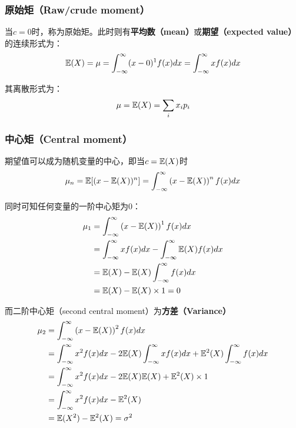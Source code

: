 \documentclass[11pt]{article}
\begin{document}
\subsubsection*{原始矩（Raw/crude moment）}

当$c=0$时，称为原始矩。此时则有\textbf{平均数（mean）}或\textbf{期望（expected value）}的连续形式为：
\begin{equation*}
    \mathbb{E}(X) = \mu = \int_{-\infty}^{\infty} (x-0)^1 f(x) dx =
    \int_{-\infty}^{\infty} x f(x) dx
\end{equation*}

其离散形式为：
\begin{equation*}
    \mu = \mathbb{E}(X) = \sum_i x_i p_i
\end{equation*}

\subsubsection*{中心矩（Central moment）}

期望值可以成为随机变量的中心，即当$c=\mathbb{E}(X)$时
\begin{equation*}
    \mu_n = \mathbb{E}[(x-\mathbb{E}(X))^n] = \int_{-\infty}^{\infty} \left(x-\mathbb{E}(X)\right)^n f(x) dx
\end{equation*}

同时可知任何变量的一阶中心矩为0：
\begin{align*}
    \mu_1 &= \int_{-\infty}^{\infty} \left(x-\mathbb{E}(X)\right)^1 f(x) dx \\
    &= \int_{-\infty}^{\infty} x f(x) dx - \int_{-\infty}^{\infty} \mathbb{E}(X) f(x) dx \\
    &= \mathbb{E}(X) - \mathbb{E}(X) \int_{-\infty}^{\infty} f(x) dx \\
    &= \mathbb{E}(X) - \mathbb{E}(X) \times 1 = 0 
\end{align*}

而二阶中心矩（second central moment）为\textbf{方差（Variance）}
\begin{align*}
    \mu_2 &= \int_{-\infty}^{\infty} \left(x-\mathbb{E}(X)\right)^2 f(x) dx \\
    &= \int_{-\infty}^{\infty} x^2 f(x)dx - 2 \mathbb{E}(X) \int_{-\infty}^{\infty} x f(x)dx + \mathbb{E}^2(X)\int_{-\infty}^{\infty}f(x)dx \\
    &= \int_{-\infty}^{\infty} x^2 f(x)dx - 2 \mathbb{E}(X) \mathbb{E}(X) + \mathbb{E}^2(X)\times 1 \\
    &= \int_{-\infty}^{\infty} x^2 f(x)dx - \mathbb{E}^2(X) \\
    &= \mathbb{E}(X^2) - \mathbb{E}^2(X) = \sigma^2
\end{align*}
\end{document}

